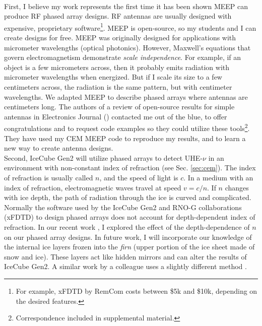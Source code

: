\documentclass[../../../main.tex]{subfiles}
\begin{document}
\\
\vspace{0.25cm}
First, I believe my work represents the first time it has been shown MEEP can produce RF phased array designs.  RF antennas are usually designed with expensive, proprietary software\footnote{For example, xFDTD by RemCom costs between \$5k and \$10k, depending on the desired features.}.  MEEP is open-source, so my students and I can create designs for free.  MEEP was originally designed for applications with micrometer wavelengths (optical photonics).  However, Maxwell's equations that govern electromagnetism demonstrate \textit{scale independence}.  For example, if an object is a few micrometers across, then it probably emits radiation with micrometer wavelengths when energized.  But if I scale its size to a few centimeters across, the radiation is the same pattern, but with centimeter wavelengths.  We adapted MEEP to describe phased arrays where antennas are centimeters long.  The authors of a review of open-source results for simple antennas in Electronics Journal (\cite{10.3390/electronics8121506}) contacted me out of the blue, to offer congratulations and to  request code examples so they could utilize these tools\footnote{Correspondence included in supplemental material.}.  They have used my CEM MEEP code to reproduce my results, and to learn a new way to create antenna designs.
\\
\vspace{0.25cm}
Second, IceCube Gen2 will utilize phased arrays to detect UHE-$\nu$ in an environment with non-constant index of refraction (see Sec. \ref{sec:cem}).  The index of refraction is usually called $n$, and the speed of light is $c$.  In a medium with an index of refraction, electromagnetic waves travel at speed $v = c/n$.  If $n$ changes with ice depth, the path of radiation through the ice is curved and complicated.  Normally the software used by the IceCube Gen2 and RNO-G collaborations (xFDTD) to design phased arrays does not account for depth-dependent index of refraction. In our recent work \cite{electronics10040415}, I explored the effect of the depth-dependence of $n$ on our phased array designs.  In future work, I will incorporate our knowledge of the internal ice layers frozen into the \textit{firn} (upper portion of the ice sheet made of snow and ice).  These layers act like hidden mirrors and can alter the results of IceCube Gen2.  A similar work by a colleague uses a slightly different method \cite{prohira}.
\\
\vspace{0.25cm}
\end{document}
